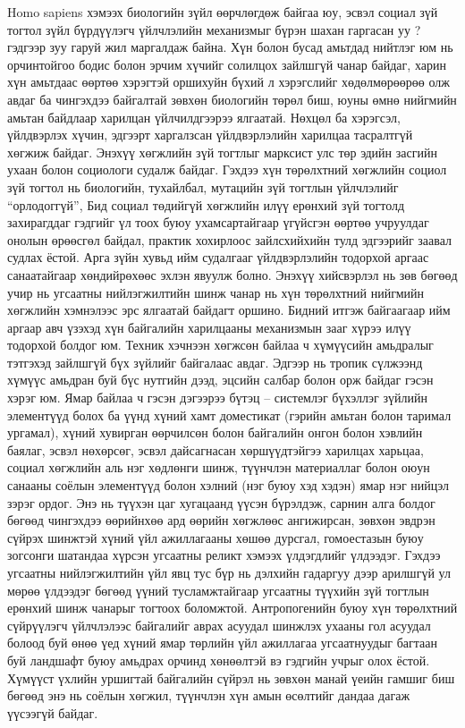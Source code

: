 Homo sapiens хэмээх биологийн зүйл өөрчлөгдөж байгаа юу, эсвэл социал зүй тогтол зүйл бүрдүүлэгч үйлчлэлийн механизмыг бүрэн шахан гаргасан уу ? гэдгээр зуу гаруй жил маргалдаж байна. Хүн болон бусад амьтдад нийтлэг юм нь орчинтойгоо бодис болон эрчим хүчийг солилцох зайлшгүй чанар байдаг, харин хүн амьтдаас өөртөө хэрэгтэй оршихуйн бүхий л хэрэгслийг хөдөлмөрөөрөө олж авдаг ба чингэхдээ байгалтай зөвхөн биологийн төрөл биш, юуны өмнө нийгмийн амьтан байдлаар харилцан үйлчилдгээрээ ялгаатай. Нөхцөл ба хэрэгсэл, үйлдвэрлэх хүчин, эдгээрт харгалзсан үйлдвэрлэлийн харилцаа тасралтгүй хөгжиж байдаг. Энэхүү хөгжлийн зүй тогтлыг марксист улс төр эдийн засгийн ухаан болон социологи судалж байдаг.
Гэхдээ хүн төрөлхтний хөгжлийн социол зүй тогтол нь биологийн, тухайлбал, мутацийн зүй тогтлын үйлчлэлийг “орлодоггүй”, Бид социал төдийгүй хөгжлийн илүү ерөнхий зүй тогтолд захирагддаг гэдгийг үл тоох буюу ухамсартайгаар үгүйсгэн өөртөө учруулдаг онолын өрөөсгөл байдал, практик хохирлоос зайлсхийхийн тулд эдгээрийг заавал судлах ёстой.
Арга зүйн хувьд ийм судалгааг үйлдвэрлэлийн тодорхой аргаас санаатайгаар хөндийрөхөөс эхлэн явуулж болно. Энэхүү хийсвэрлэл нь зөв бөгөөд учир нь угсаатны нийлэгжилтийн шинж чанар нь хүн төрөлхтний нийгмийн хөгжлийн хэмнэлээс эрс ялгаатай байдагт оршино. Бидний итгэж байгаагаар ийм аргаар авч үзэхэд хүн байгалийн харилцааны механизмын зааг хүрээ илүү тодорхой болдог юм.
Техник хэчнээн хөгжсөн байлаа ч хүмүүсийн амьдралыг тэтгэхэд зайлшгүй бүх зүйлийг байгалаас авдаг. Эдгээр нь тропик сүлжээнд хүмүүс амьдран буй бүс нутгийн дээд, эцсийн салбар болон орж байдаг гэсэн хэрэг юм. Ямар байлаа ч гэсэн дэгээрээ бүтэц – системлэг бүхэллэг зүйлийн элементүүд болох ба үүнд хүний хамт доместикат (гэрийн амьтан болон таримал ургамал), хүний хувирган өөрчилсөн болон байгалийн онгон болон хэвлийн баялаг, эсвэл нөхөрсөг, эсвэл дайсагнасан хөршүүдтэйгээ харилцах харьцаа, социал хөгжлийн аль нэг хөдлөнги шинж, түүнчлэн материаллаг болон оюун санааны соёлын элементүүд болон хэлний (нэг буюу хэд хэдэн) ямар нэг нийцэл зэрэг ордог.
Энэ нь түүхэн цаг хугацаанд үүсэн бүрэлдэж, сарнин алга болдог бөгөөд чингэхдээ өөрийнхөө ард өөрийн хөгжлөөс ангижирсан, зөвхөн эвдрэн сүйрэх шинжтэй хүний үйл ажиллагааны хөшөө дурсгал, гомоестазын буюу зогсонги шатандаа хүрсэн угсаатны реликт хэмээх үлдэгдлийг үлдээдэг. Гэхдээ угсаатны нийлэгжилтийн үйл явц тус бүр нь дэлхийн гадаргуу дээр арилшгүй ул мөрөө үлдээдэг бөгөөд үүний тусламжтайгаар угсаатны түүхийн зүй тогтлын ерөнхий шинж чанарыг тогтоох боломжтой. Антропогенийн буюу хүн төрөлхтний сүйрүүлэгч үйлчлэлээс байгалийг аврах асуудал шинжлэх ухааны гол асуудал болоод буй өнөө үед хүний ямар төрлийн үйл ажиллагаа угсаатнуудыг багтаан буй ландшафт буюу амьдрах орчинд хөнөөлтэй вэ гэдгийн учрыг олох ёстой. Хүмүүст үхлийн уршигтай байгалийн сүйрэл нь зөвхөн манай үеийн гамшиг биш бөгөөд энэ нь соёлын хөгжил, түүнчлэн хүн амын өсөлтийг дандаа дагаж үүсээгүй байдаг.
